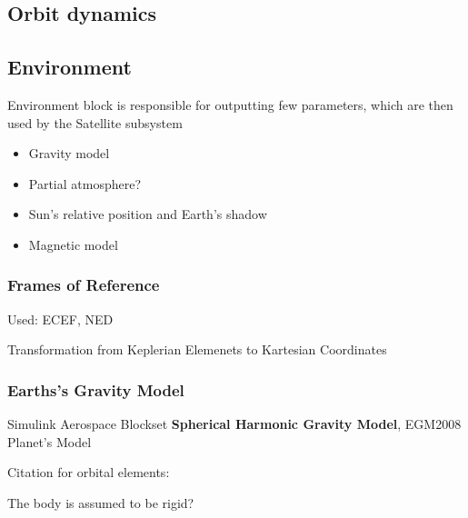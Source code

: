 \subsection{Orbit dynamics}

\subsection{Environment}
    Environment block is responsible for outputting few parameters, which are then used by the Satellite subsystem
    \begin{itemize}
        \item Gravity model
        \item Partial atmosphere?
        \item Sun's relative position and Earth's shadow
        \item Magnetic model
    \end{itemize}

    \subsubsection{Frames of Reference}
        Used: ECEF, NED

        Transformation from Keplerian Elemenets to Kartesian Coordinates


    \subsubsection{Earths's Gravity Model}
        Simulink Aerospace Blockset \textbf{Spherical Harmonic Gravity Model}, EGM2008 Planet's Model

    Citation for orbital elements: \cite{vallado2001fundamentals}

    The body is assumed to be rigid?
